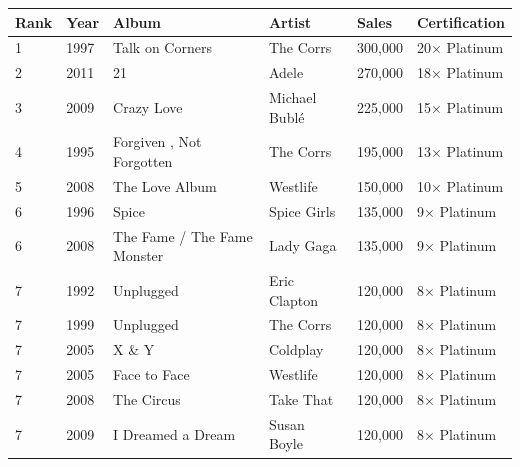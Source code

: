 \documentclass{article}
\begin{document}
\begin{tabular}{llllll}
\toprule
Rank & Year & Album & Artist & Sales & Certification \\
\midrule
1 & 1997 & Talk on Corners & The Corrs & 300,000 & 20× Platinum \\
2 & 2011 & 21 & Adele & 270,000 & 18× Platinum \\
3 & 2009 & Crazy Love & Michael Bublé & 225,000 & 15× Platinum \\
4 & 1995 & Forgiven , Not Forgotten & The Corrs & 195,000 & 13× Platinum \\
5 & 2008 & The Love Album & Westlife & 150,000 & 10× Platinum \\
6 & 1996 & Spice & Spice Girls & 135,000 & 9× Platinum \\
6 & 2008 & The Fame / The Fame Monster & Lady Gaga & 135,000 & 9× Platinum \\
7 & 1992 & Unplugged & Eric Clapton & 120,000 & 8× Platinum \\
7 & 1999 & Unplugged & The Corrs & 120,000 & 8× Platinum \\
7 & 2005 & X \& Y & Coldplay & 120,000 & 8× Platinum \\
7 & 2005 & Face to Face & Westlife & 120,000 & 8× Platinum \\
7 & 2008 & The Circus & Take That & 120,000 & 8× Platinum \\
7 & 2009 & I Dreamed a Dream & Susan Boyle & 120,000 & 8× Platinum \\
\bottomrule
\end{tabular}
\end{document}
